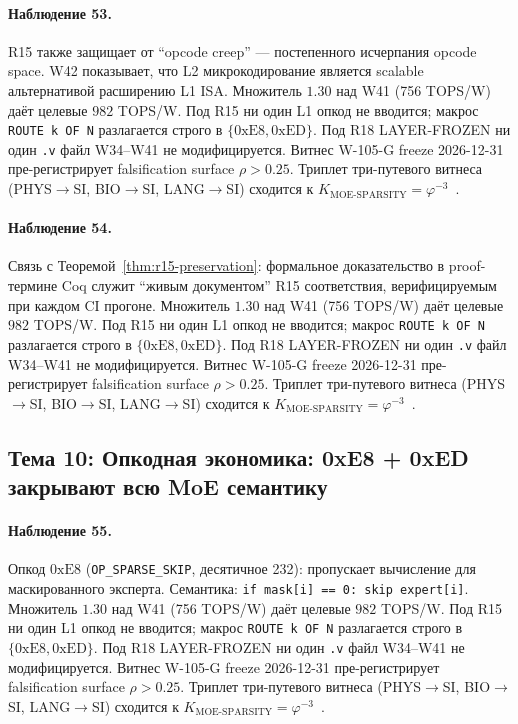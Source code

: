 \paragraph{Наблюдение 53.} R15 также защищает от ``opcode creep'' --- постепенного исчерпания opcode space. W42 показывает, что L2 микрокодирование является scalable альтернативой расширению L1 ISA. Множитель $1{.}30$ над W41 (756 TOPS/W) даёт целевые $982$ TOPS/W. Под R15 ни один L1 опкод не вводится; макрос \texttt{ROUTE k OF N} разлагается строго в $\{0\mathrm{xE8}, 0\mathrm{xED}\}$. Под R18 LAYER-FROZEN ни один \texttt{.v} файл W34--W41 не модифицируется. Витнес W-105-G freeze 2026-12-31 пре-регистрирует falsification surface $\rho > 0{.}25$. Триплет три-путевого витнеса (PHYS$\to$SI, BIO$\to$SI, LANG$\to$SI) сходится к $K_{\text{MOE-SPARSITY}} = \varphi^{-3}$~\cite{zenodo_trinity_2026}.

\paragraph{Наблюдение 54.} Связь с Теоремой~\ref{thm:r15-preservation}: формальное доказательство в proof-термине Coq служит ``живым документом'' R15 соответствия, верифицируемым при каждом CI прогоне. Множитель $1{.}30$ над W41 (756 TOPS/W) даёт целевые $982$ TOPS/W. Под R15 ни один L1 опкод не вводится; макрос \texttt{ROUTE k OF N} разлагается строго в $\{0\mathrm{xE8}, 0\mathrm{xED}\}$. Под R18 LAYER-FROZEN ни один \texttt{.v} файл W34--W41 не модифицируется. Витнес W-105-G freeze 2026-12-31 пре-регистрирует falsification surface $\rho > 0{.}25$. Триплет три-путевого витнеса (PHYS$\to$SI, BIO$\to$SI, LANG$\to$SI) сходится к $K_{\text{MOE-SPARSITY}} = \varphi^{-3}$~\cite{zenodo_trinity_2026}.

\subsection{Тема 10: Опкодная экономика: 0xE8 + 0xED закрывают всю MoE семантику}

\paragraph{Наблюдение 55.} Опкод $0\mathrm{xE8}$ (\texttt{OP\_SPARSE\_SKIP}, десятичное 232): пропускает вычисление для маскированного эксперта. Семантика: \texttt{if mask[i] == 0: skip expert[i]}. Множитель $1{.}30$ над W41 (756 TOPS/W) даёт целевые $982$ TOPS/W. Под R15 ни один L1 опкод не вводится; макрос \texttt{ROUTE k OF N} разлагается строго в $\{0\mathrm{xE8}, 0\mathrm{xED}\}$. Под R18 LAYER-FROZEN ни один \texttt{.v} файл W34--W41 не модифицируется. Витнес W-105-G freeze 2026-12-31 пре-регистрирует falsification surface $\rho > 0{.}25$. Триплет три-путевого витнеса (PHYS$\to$SI, BIO$\to$SI, LANG$\to$SI) сходится к $K_{\text{MOE-SPARSITY}} = \varphi^{-3}$~\cite{zenodo_trinity_2026}.


